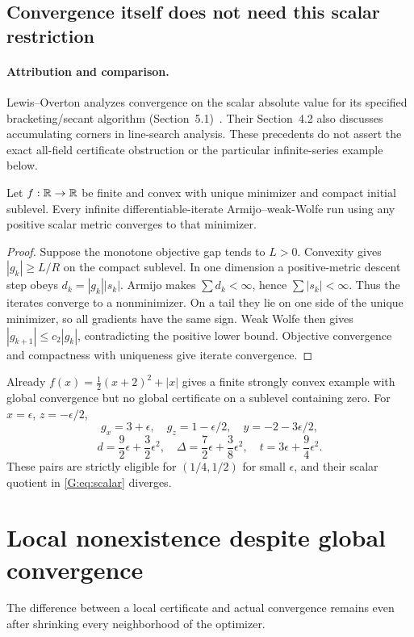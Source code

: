 \subsection{Convergence itself does not need this scalar restriction}
\paragraph{Attribution and comparison.}
Lewis--Overton analyzes convergence on the scalar absolute value for its specified bracketing/secant algorithm (Section~5.1)~\cite{LO}. Their Section~4.2 also discusses accumulating corners in line-search analysis. These precedents do not assert the exact all-field certificate obstruction or the particular infinite-series example below.

\begin{proposition}\label{G:prop:scalarconv}
Let $f:\mathbb R\to\mathbb R$ be finite and convex with unique minimizer and compact initial sublevel. Every infinite differentiable-iterate Armijo--weak-Wolfe run using any positive scalar metric converges to that minimizer.
\end{proposition}
\begin{proof}
Suppose the monotone objective gap tends to $L>0$. Convexity gives $|g_k|\ge L/R$ on the compact sublevel. In one dimension a positive-metric descent step obeys $d_k=|g_k||s_k|$. Armijo makes $\sum d_k<\infty$, hence $\sum|s_k|<\infty$. Thus the iterates converge to a nonminimizer. On a tail they lie on one side of the unique minimizer, so all gradients have the same sign. Weak Wolfe then gives $|g_{k+1}|\le c_2|g_k|$, contradicting the positive lower bound. Objective convergence and compactness with uniqueness give iterate convergence.
\end{proof}
Already $f(x)=\frac12(x+2)^2+|x|$ gives a finite strongly convex example with global convergence but no global certificate on a sublevel containing zero. For $x=\epsilon$, $z=-\epsilon/2$,
\[
 g_x=3+\epsilon,\quad g_z=1-\epsilon/2,\quad y=-2-3\epsilon/2,
\]
\[
 d=\frac92\epsilon+\frac32\epsilon^2,\quad
 \Delta=\frac72\epsilon+\frac38\epsilon^2,\quad
 t=3\epsilon+\frac94\epsilon^2.
\]
These pairs are strictly eligible for $(1/4,1/2)$ for small $\epsilon$, and their scalar quotient in \eqref{G:eq:scalar} diverges.


\setcounter{section}{6}
\setcounter{theorem}{0}
\setcounter{equation}{6}
\section{Local nonexistence despite global convergence}
The difference between a local certificate and actual convergence remains even after shrinking every neighborhood of the optimizer.

